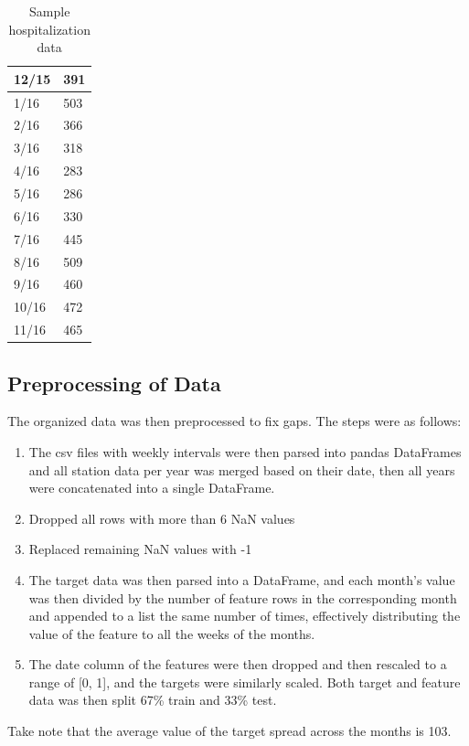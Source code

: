\documentclass[10pt,11pt,12pt,oneside]{book}
\begin{document}
\begin{table}[H]
{\begin{tabular}{|l|l|}
\hline
12/15 & 391     \\
\hline
1/16  & 503     \\
\hline
2/16  & 366     \\
\hline
3/16  & 318     \\
\hline
4/16  & 283     \\
\hline
5/16  & 286     \\
\hline
6/16  & 330     \\
\hline
7/16  & 445     \\
\hline
8/16  & 509     \\
\hline
9/16  & 460     \\
\hline
10/16 & 472     \\
\hline
11/16 & 465     \\
\hline

\end{tabular}
\caption{Sample hospitalization data}
\label{table:data_csv2}
}
\end{table}

    \subsection{Preprocessing of Data}
    The organized data was then preprocessed to fix gaps. The steps were as follows:
    \begin{enumerate}
        \item The csv files with weekly intervals were then parsed into pandas DataFrames and all station data per year was merged based on their date, then all years were concatenated into a single DataFrame.
        \item Dropped all rows with more than 6 NaN values
        \item Replaced remaining NaN values with -1
        \item The target data was then parsed into a DataFrame, and each month's value was then divided by the number of feature rows in the corresponding month and appended
to a list the same number of times, effectively distributing the value of the feature to all the weeks of the months.
        \item The date column of the features were then dropped and then rescaled to a range of [0, 1], and the targets were similarly scaled. Both target and feature data was then split 67\% train and 33\%  test. 
    \end{enumerate}
    Take note that the average value of the target spread across the months is 103.
\end{document}
